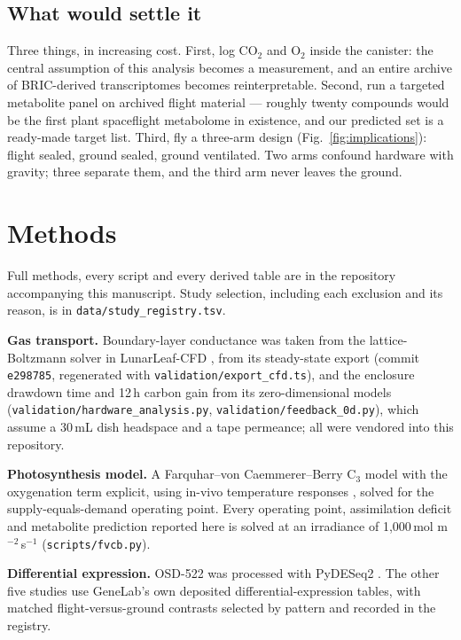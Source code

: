 \documentclass[pdflatex,sn-nature]{sn-jnl}
\begin{document}
\subsection{What would settle it}

Three things, in increasing cost. First, log CO$_2$ and O$_2$ inside the canister: the central
assumption of this analysis becomes a measurement, and an entire archive of BRIC-derived
transcriptomes becomes reinterpretable. Second, run a targeted metabolite panel on archived
flight material --- roughly twenty compounds would be the first plant spaceflight metabolome
in existence, and our predicted set is a ready-made target list. Third, fly a three-arm design
(Fig.~\ref{fig:implications}): flight sealed, ground sealed, ground ventilated. Two arms
confound hardware with gravity; three separate them, and the third arm never leaves the
ground.

\section{Methods}\label{sec:methods}

Full methods, every script and every derived table are in the repository accompanying this
manuscript. Study selection, including each exclusion and its reason, is in
\texttt{data/study\_registry.tsv}.

\textbf{Gas transport.} Boundary-layer conductance was taken from the lattice-Boltzmann
solver in LunarLeaf-CFD \citep{lunarleaf}, from its steady-state export (commit
\texttt{e298785}, regenerated with \texttt{validation/export\_cfd.ts}), and the enclosure drawdown time and 12\,h carbon
gain from its zero-dimensional models (\texttt{validation/hardware\_analysis.py},
\texttt{validation/feedback\_0d.py}), which assume a 30\,mL dish headspace and a tape
permeance; all were vendored into this repository.

\textbf{Photosynthesis model.} A Farquhar--von Caemmerer--Berry C$_3$ model \citep{farquhar1980}
with the oxygenation term explicit, using in-vivo temperature responses
\citep{bernacchi2001,bernacchi2003}, solved for the supply-equals-demand operating point.
Every operating point, assimilation deficit and metabolite prediction reported here is solved
at an irradiance of 1{,}000\,\textmu mol m$^{-2}$\,s$^{-1}$ (\texttt{scripts/fvcb.py}).

\textbf{Differential expression.} OSD-522 was processed with PyDESeq2 \citep{pydeseq2}. The
other five studies use GeneLab's own deposited differential-expression tables, with matched
flight-versus-ground contrasts selected by pattern and recorded in the registry.
\end{document}
